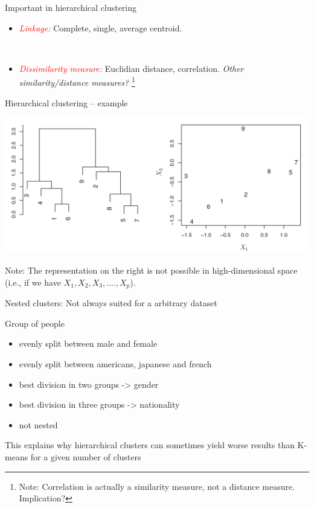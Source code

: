 \documentclass[
  10pt,
  ignorenonframetext,
]{beamer}
\providecommand{\tightlist}{%
  \setlength{\itemsep}{0pt}\setlength{\parskip}{0pt}}
\begin{document}
\begin{frame}{Important in hierarchical clustering}
\label{important-in-hierarchical-clustering}
\(~\)

\begin{itemize}
\tightlist
\item
  \emph{\textcolor{red}{Linkage:}} Complete, single, average centroid.
\end{itemize}

\(~\)

\begin{itemize}
\tightlist
\item
  \emph{\textcolor{red}{Dissimilarity measure:}} Euclidian distance,
  correlation. \emph{Other similarity/distance measures?}
  \footnote{ Note: Correlation is actually a similarity measure, not a distance measure. Implication?}
\end{itemize}
\end{frame}

\begin{frame}{Hierarchical clustering -- example}
\label{hierarchical-clustering-example}
\(~\)

\includegraphics{imgs/dendogram_misleading.png}

Note: The representation on the right is not possible in
high-dimensional space (i.e., if we have \(X_1, X_2, X_3, ...., X_p\)).
\end{frame}

\begin{frame}{Nested clusters:}
\label{nested-clusters}
Not always suited for a arbitrary dataset

Group of people

\begin{itemize}
\tightlist
\item
  evenly split between male and female
\item
  evenly split between americans, japanese and french
\item
  best division in two groups -\textgreater{} gender
\item
  best division in three groups -\textgreater{} nationality
\item
  not nested
\end{itemize}

This explains why hierarchical clusters can sometimes yield worse
results than K-means for a given number of clusters
\end{frame}
\end{document}
